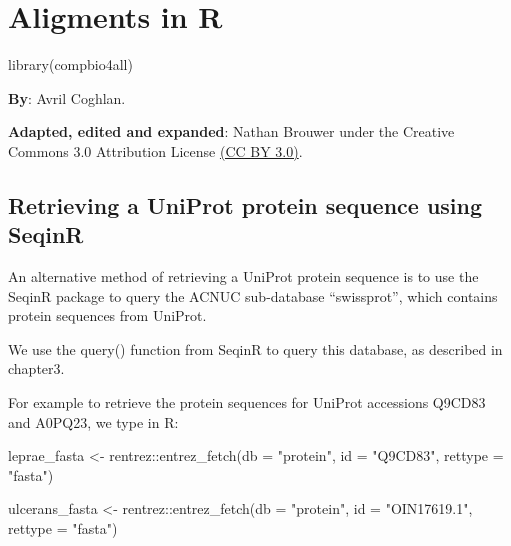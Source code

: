 \documentclass[
]{book}
\newenvironment{Shaded}{\begin{snugshade}}{\end{snugshade}}
\newcommand{\AttributeTok}[1]{\textcolor[rgb]{0.77,0.63,0.00}{#1}}
\newcommand{\FunctionTok}[1]{\textcolor[rgb]{0.00,0.00,0.00}{#1}}
\newcommand{\NormalTok}[1]{#1}
\newcommand{\OtherTok}[1]{\textcolor[rgb]{0.56,0.35,0.01}{#1}}
\newcommand{\SpecialCharTok}[1]{\textcolor[rgb]{0.00,0.00,0.00}{#1}}
\newcommand{\StringTok}[1]{\textcolor[rgb]{0.31,0.60,0.02}{#1}}
\begin{document}
\hypertarget{aligments-in-r}{%
\chapter{Aligments in R}\label{aligments-in-r}}

\begin{Shaded}
\begin{Highlighting}[]
\FunctionTok{library}\NormalTok{(compbio4all)}
\end{Highlighting}
\end{Shaded}

\textbf{By}: Avril Coghlan.

\textbf{Adapted, edited and expanded}: Nathan Brouwer under the Creative Commons 3.0 Attribution License \href{https://creativecommons.org/licenses/by/3.0/}{(CC BY 3.0)}.

\hypertarget{retrieving-a-uniprot-protein-sequence-using-seqinr}{%
\section{Retrieving a UniProt protein sequence using SeqinR}\label{retrieving-a-uniprot-protein-sequence-using-seqinr}}

An alternative method of retrieving a UniProt protein sequence is to use the SeqinR package to query the ACNUC sub-database ``swissprot'', which contains protein sequences from UniProt.

We use the query() function from SeqinR to query this database, as described in chapter3.

For example to retrieve the protein sequences for UniProt accessions Q9CD83 and A0PQ23, we type in R:

\begin{Shaded}
\begin{Highlighting}[]
\NormalTok{leprae\_fasta }\OtherTok{\textless{}{-}}\NormalTok{ rentrez}\SpecialCharTok{::}\FunctionTok{entrez\_fetch}\NormalTok{(}\AttributeTok{db =} \StringTok{"protein"}\NormalTok{,}
                        \AttributeTok{id =} \StringTok{"Q9CD83"}\NormalTok{,}
                         \AttributeTok{rettype =} \StringTok{"fasta"}\NormalTok{)}

\NormalTok{ulcerans\_fasta }\OtherTok{\textless{}{-}}\NormalTok{ rentrez}\SpecialCharTok{::}\FunctionTok{entrez\_fetch}\NormalTok{(}\AttributeTok{db =} \StringTok{"protein"}\NormalTok{,}
                         \AttributeTok{id =} \StringTok{"OIN17619.1"}\NormalTok{,}
                         \AttributeTok{rettype =} \StringTok{"fasta"}\NormalTok{)}
\end{Highlighting}
\end{Shaded}
\end{document}
